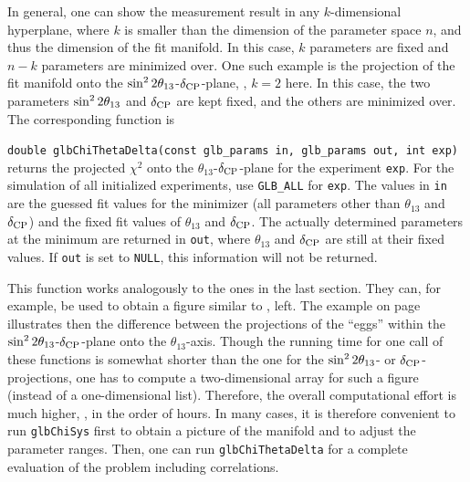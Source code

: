 In general, one can show the measurement result in any $k$-dimensional hyperplane, where $k$ is smaller than the dimension of the parameter space $n$, and thus the dimension of the fit manifold. In this case, $k$ parameters are fixed and $n-k$ parameters are minimized over. One such example is the projection of the fit manifold onto the $\sin^2 2 \theta_{13}$-$\delta_{\mathrm{CP}}$-plane, \ie, $k=2$ here. In this case, the two
parameters $\sin^2 2 \theta_{13}$ and $\delta_{\mathrm{CP}}$ are kept fixed, and the others are
minimized over. 
The corresponding function is
\begin{function}
{\tt double glbChiThetaDelta(const glb\_params in, glb\_params out, int exp)} returns the projected $\chi^2$ onto the $\theta_{13}$-$\delta_{\mathrm{CP}}$-plane for the  experiment {\tt exp}. For the simulation of all initialized experiments,
use {\tt GLB\_ALL} for {\tt exp}. The values in {\tt in} are the guessed fit values for the minimizer (all parameters other than $\theta_{13}$ and $\delta_{\mathrm{CP}}$) and the fixed fit values of $\theta_{13}$ and $\delta_{\mathrm{CP}}$. The actually determined parameters at the minimum are returned in {\tt out}, where $\theta_{13}$ and $\delta_{\mathrm{CP}}$ are still at their fixed values. If {\tt out} is set to {\tt NULL}, this information will not be returned.
\end{function}
This function works analogously to the ones in the last section. They can, for example, be used to obtain a figure similar to , left.
The example on page~\pageref{ex:corrproj} illustrates then the difference
between the projections of the ``eggs'' within the 
$\sin^2 2 \theta_{13}$-$\delta_{\mathrm{CP}}$-plane onto the $\theta_{13}$-axis. 
Though the running time for one call of these functions is somewhat 
shorter than the one for the $\sin^2 2 \theta_{13}$- or $\delta_{\mathrm{CP}}$-projections, one 
has to compute a two-dimensional array for such a figure (instead of a 
one-dimensional list). Therefore, the overall computational effort is 
much higher, \ie, in the order of hours. In many cases, it is therefore
convenient to run {\tt glbChiSys} first to obtain a picture of
the manifold and to adjust the parameter ranges. Then, one can run
{\tt glbChiThetaDelta} for a complete evaluation of the problem
including correlations.

